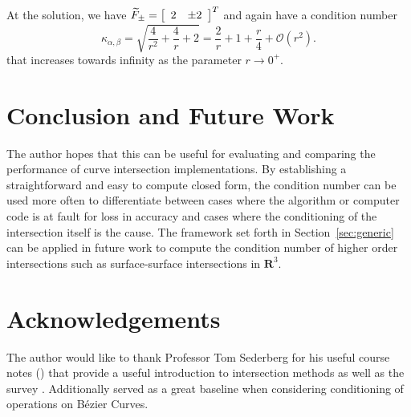 \documentclass[3p, authoryear, square]{elsarticle}
\theoremstyle{definition}
\newcommand{\reals}{\mathbf{R}}
\newcommand{\bigO}[1]{\mathcal{O}\left(#1\right)}
\begin{document}
At the solution, we have \(\widetilde{F}_{\pm} = \left[ \begin{array}{c c}
2 & \pm 2 \end{array}\right]^T\)
and again have a condition number
\begin{equation}
\kappa_{\alpha, \beta} = \sqrt{\frac{4}{r^2} + \frac{4}{r} + 2} =
  \frac{2}{r} + 1 + \frac{r}{4} + \bigO{r^2}.
\end{equation}
that increases towards infinity as the parameter \(r \longrightarrow 0^+\).

\section{Conclusion and Future Work}

The author hopes that this can be useful for evaluating and comparing the
performance of curve intersection implementations. By establishing a
straightforward and easy to compute closed form, the condition number can be
used more often to differentiate between cases where the algorithm or computer
code is at fault for loss in accuracy and cases where the conditioning of the
intersection itself is the cause. The framework set forth in
Section~\ref{sec:generic} can be applied in future work to compute the
condition number of higher order intersections such as surface-surface
intersections in \(\reals^3\).

\section{Acknowledgements}

The author would like to thank Professor Tom Sederberg for his useful
course notes (\cite{SederbergNotes}) that provide a useful introduction to
intersection methods as well as the survey \cite{Sederberg1986}. Additionally
\cite{Farouki1987} served as a great baseline when considering conditioning
of operations on B\'{e}zier Curves.

\section*{\refname}

\end{document}
